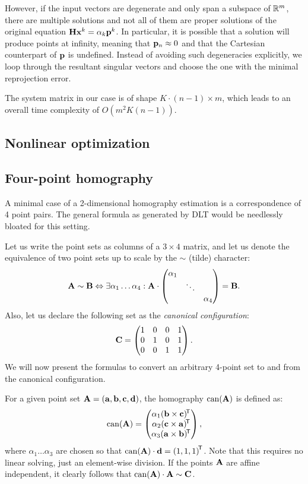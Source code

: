 However, if the input vectors are degenerate and only span a subspace of $\mathbb{R}^m$, there are multiple solutions and not all of them are proper solutions of the original equation $\mathbf{H} \mathbf{x}^k = \alpha_k \mathbf{p}^k$.
In particular, it is possible that a solution will produce points at infinity, meaning that $\mathbf{p}_n \approx 0$ and that the Cartesian counterpart of $\mathbf{p}$ is undefined.
Instead of avoiding such degeneracies explicitly, we loop through the resultant singular vectors and choose the one with the minimal reprojection error.

The system matrix in our case is of shape $K \cdot (n - 1) \times m$, which leads to an overall time complexity of $O(m^2 K (n - 1))$.

\subsection{Nonlinear optimization}


\subsection{Four-point homography}

A minimal case of a 2-dimensional homography estimation is a correspondence of 4 point pairs.
The general formula as generated by DLT would be needlessly bloated for this setting.

Let us write the point sets as columns of a $3 \times 4$ matrix, and let us denote the equivalence of two point sets up to scale by the $\sim$ (tilde) character:
$$\mathbf{A} \sim \mathbf{B} \Leftrightarrow \exists \alpha_1 \dots \alpha_4 : \mathbf{A} \cdot \begin{pmatrix}
 \alpha_1 & & \\
  & \ddots & \\
 & & \alpha_4
 \end{pmatrix} = \mathbf{B}.$$
Also, let us declare the following set as the \textit{canonical configuration}:
$$\mathbf{C} = \begin{pmatrix}
 1 & 0 & 0 & 1 \\
 0 & 1 & 0 & 1 \\
 0 & 0 & 1 & 1
 \end{pmatrix}.$$
We will now present the formulas to convert an arbitrary 4-point set to and from the canonical configuration.

For a given point set $\mathbf{A} = \left( \mathbf{a}, \mathbf{b}, \mathbf{c}, \mathbf{d} \right)$, the homography $\mathrm{can}(\mathbf{A})$ is defined as:
$$\mathrm{can}(\mathbf{A}) = \begin{pmatrix}
 \alpha_1 (\mathbf{b} \times \mathbf{c}) ^{\!\mathsf{T}} \\
 \alpha_2 (\mathbf{c} \times \mathbf{a}) ^{\!\mathsf{T}} \\
 \alpha_3 (\mathbf{a} \times \mathbf{b}) ^{\!\mathsf{T}} \\
 \end{pmatrix},
$$
where $\alpha_1 \dots \alpha_3$ are chosen so that $\mathrm{can}(\mathbf{A}) \cdot \mathbf{d} = \left( 1, 1, 1 \right)^{\!\mathsf{T}}$.
Note that this requires no linear solving, just an element-wise division.
If the points $\mathbf{A}$ are affine independent, it clearly follows that $\mathrm{can}(\mathbf{A}) \cdot \mathbf{A} \sim \mathbf{C}$.

